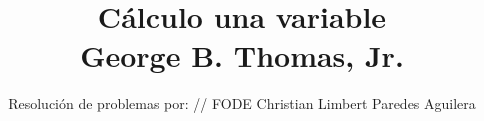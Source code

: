 \normalfont

\author{\Large Resolución de problemas por: // FODE \small Christian Limbert Paredes Aguilera}
\title{Cálculo una variable \\ \small George B. Thomas, Jr.}
\date{}
\pagestyle{empty}
\maketitle
\thispagestyle{empty}
\let\cleardoublepage\clearpage
\tableofcontents								%


 
\let\cleardoublepage\clearpage
